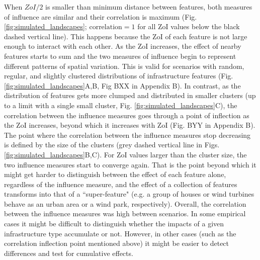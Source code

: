 \documentclass[titlepage]{article}
\begin{document}
When $ZoI/2$ is smaller than minimum distance between features, both measures of influence are similar and their correlation is maximum (Fig. \ref{fig:simulated_landscapes}; $\text{correlation} = 1$ for all ZoI values below the black dashed vertical line). This happens because the ZoI of each feature is not large enough to interact with each other. As the ZoI increases, the effect of nearby features starts to sum and the two measures of influence begin to represent different patterns of spatial variation. This is valid for scenarios with random, regular, and slightly clustered distributions of infrastructure features (Fig. \ref{fig:simulated_landscapes}A,B, Fig BXX in Appendix B). In contrast, as the distribution of features gets more clumped and distributed in smaller clusters (up to a limit with a single small cluster, Fig. \ref{fig:simulated_landscapes}C), the correlation between the influence measures goes through a point of inflection as the ZoI increases, beyond which it increases with ZoI (Fig. BYY in Appendix B). The point where the correlation between the influence measures stop decreasing is defined by the size of the clusters (grey dashed vertical line in Figs. \ref{fig:simulated_landscapes}B,C). For ZoI values larger than the cluster size, the two influence measures start to converge again. That is the point beyond which it might get harder to distinguish between the effect of each feature alone, regardless of the influence measure, and the effect of a collection of features transforms into that of a ``super-feature" (e.g. a group of houses or wind turbines behave as an urban area or a wind park, respectively). 
Overall, the correlation between the influence measures was high between scenarios. In some empirical cases it might be difficult to distinguish whether the impacts of a given infrastructure type accumulate or not. However, in other cases (such as the correlation inflection point mentioned above) it might be easier to detect differences and test for cumulative effects.

\end{document}
